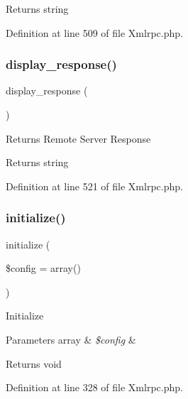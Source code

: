 \begin{DoxyReturn}{Returns}
string 
\end{DoxyReturn}


Definition at line 509 of file Xmlrpc.\+php.

\mbox{\label{class_c_i___xmlrpc_a3a8aedc2a1e6a67ad248dc6078ce8614}} 
\subsubsection{\texorpdfstring{display\_response()}{display\_response()}}
{\footnotesize\ttfamily display\+\_\+response (\begin{DoxyParamCaption}{ }\end{DoxyParamCaption})}

Returns Remote Server Response

\begin{DoxyReturn}{Returns}
string 
\end{DoxyReturn}


Definition at line 521 of file Xmlrpc.\+php.

\mbox{\label{class_c_i___xmlrpc_a481385e36d920f5a5005ace05c6cd016}} 
\subsubsection{\texorpdfstring{initialize()}{initialize()}}
{\footnotesize\ttfamily initialize (\begin{DoxyParamCaption}\item[{}]{\$config = {\ttfamily array()} }\end{DoxyParamCaption})}

Initialize


\begin{DoxyParams}[1]{Parameters}
array & {\em \$config} & \\
\hline
\end{DoxyParams}
\begin{DoxyReturn}{Returns}
void 
\end{DoxyReturn}


Definition at line 328 of file Xmlrpc.\+php.

\mbox{\label{class_c_i___xmlrpc_a3d7e090549ec52eba8cf65598eefa72c}} 
